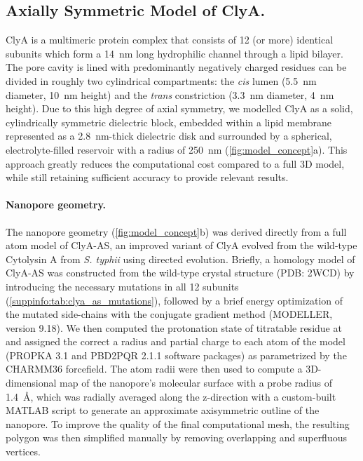 \documentclass[journal=ancac3, manuscript=article, etalmode=truncate,maxauthors=0]{achemso}
\begin{document}
\subsection{Axially Symmetric Model of ClyA.}

ClyA is a multimeric protein complex that consists of 12 (or more) identical subunits which form a 
\SI{14}{\nano\meter} long hydrophilic channel through a lipid bilayer. The pore cavity is lined with 
predominantly negatively charged residues can be divided in roughly two cylindrical compartments: the 
\textit{cis} lumen (\SI{5.5}{\nano\meter} diameter, \SI{10}{\nano\meter} height) and the \textit{trans} 
constriction (\SI{3.3}{\nano\meter} diameter, \SI{4}{\nano\meter} height). Due to this high degree of axial 
symmetry, we modelled ClyA as a solid, cylindrically symmetric dielectric block, embedded within a lipid 
membrane represented as a \SI{2.8}{\nano\meter}-thick\cite{kucerka2011} dielectric disk  and surrounded by a 
spherical, electrolyte-filled reservoir with a radius of \SI{250}{\nano\meter} 
(\cref{fig:model_concept}a).\cite{lu2012,pederson2015} This approach greatly reduces the computational cost 
compared to a full 3D model, while still retaining sufficient accuracy to provide relevant results. 

\paragraph{Nanopore geometry.}
The nanopore geometry (\cref{fig:model_concept}b) was derived directly from a full atom model of ClyA-AS,
an improved variant of ClyA evolved from the wild-type Cytolysin A from \textit{S. typhii} using directed 
evolution.\cite{soskine2013} Briefly, a homology model of ClyA-AS was constructed from the wild-type crystal 
structure (PDB: 2WCD)\cite{mueller2009} by introducing the necessary mutations in all 12 subunits 
(\cref{suppinfo:tab:clya_as_mutations}), followed by a brief energy optimization of the mutated side-chains 
with the conjugate gradient method (MODELLER, version 9.18).\cite{sali1993} We then computed the protonation 
state of titratable residue at  and assigned the correct a radius and partial charge to each atom of 
the model (PROPKA 3.1\cite{olsson2011} and PBD2PQR 2.1.1\cite{jurrus2018} software packages) as parametrized 
by the CHARMM36 forcefield.\cite{best2012} The atom radii were then used to compute a 3D-dimensional map of 
the nanopore's molecular surface with a probe radius of \SI{1.4}{\angstrom}, which was radially averaged 
along the z-direction with a custom-built MATLAB script to generate an approximate axisymmetric outline of 
the nanopore. To improve the quality of the final computational mesh, the resulting polygon was then 
simplified manually by removing overlapping and superfluous vertices.
\end{document}
